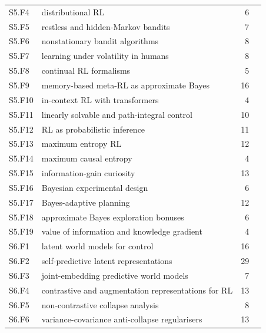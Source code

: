 \documentclass[10pt]{article}
\begin{document}
{\begin{longtable}{@{}p{1.3cm}p{8.6cm}rp{4.4cm}@{}}
S5.F4 & distributional RL & 6 & \citet{Bellemare-distributional17}\\
S5.F5 & restless and hidden-Markov bandits & 7 & \citet{Meshram-whittle16}\\
S5.F6 & nonstationary bandit algorithms & 8 & \citet{Garivier-upperconfidence08}\\
S5.F7 & learning under volatility in humans & 8 & \citet{Yu-uncertainty05}\\
S5.F8 & continual RL formalisms & 5 & \citet{Khetarpal-continual20}\\
S5.F9 & memory-based meta-RL as approximate Bayes & 16 & \citet{Duan-rl16}\\
S5.F10 & in-context RL with transformers & 4 & \citet{Laskin-context22}\\
S5.F11 & linearly solvable and path-integral control & 10 & \citet{Todorov-efficient09}\\
S5.F12 & RL as probabilistic inference & 11 & \citet{Levine-reinforcement18}\\
S5.F13 & maximum entropy RL & 12 & \citet{Haarnoja-reinforcement17}\\
S5.F14 & maximum causal entropy & 4 & \citet{Grunwald-game04}\\
S5.F15 & information-gain curiosity & 13 & \citet{Schmidhuber-curious91}\\
S5.F16 & Bayesian experimental design & 6 & \citet{Lindley-measure56}\\
S5.F17 & Bayes-adaptive planning & 12 & \citet{Bellman-adaptive59}\\
S5.F18 & approximate Bayes exploration bonuses & 6 & \citet{Lidayan-bamdp25}\\
S5.F19 & value of information and knowledge gradient & 4 & \citet{Howard-information66}\\
S6.F1 & latent world models for control & 16 & \citet{Watter-embed15}\\
S6.F2 & self-predictive latent representations & 29 & \citet{Jaderberg-reinforcement16}\\
S6.F3 & joint-embedding predictive world models & 7 & \citet{Assran-selfsupervised23}\\
S6.F4 & contrastive and augmentation representations for RL & 13 & \citet{Hjelm-learning18}\\
S6.F5 & non-contrastive collapse analysis & 8 & \citet{Chen-exploring20}\\
S6.F6 & variance-covariance anti-collapse regularisers & 13 & \citet{Wang-understanding20}\\

\end{longtable}}
\end{document}
